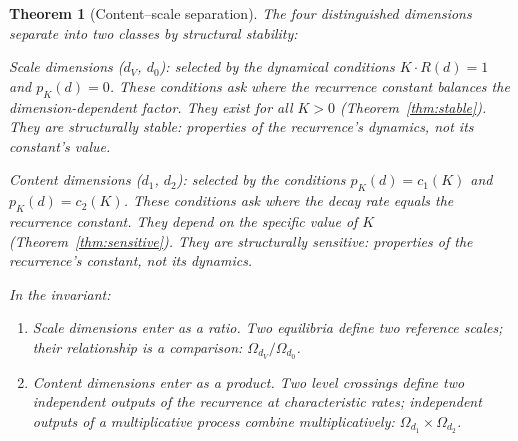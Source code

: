 \documentclass[11pt,a4paper]{article}
\newtheorem{theorem}{Theorem}[section]
\begin{document}
\begin{theorem}[Content--scale separation]\label{thm:cs}
The four distinguished dimensions separate into two classes by structural
stability:

\emph{Scale dimensions} ($d_V$, $d_0$): selected by the dynamical
conditions $K\cdot R(d) = 1$ and $p_K(d) = 0$. These conditions ask where
the recurrence constant \emph{balances} the dimension-dependent factor.
They exist for all $K > 0$ (Theorem~\ref{thm:stable}). They are
structurally stable: properties of the recurrence's dynamics, not its
constant's value.

\emph{Content dimensions} ($d_1$, $d_2$): selected by the conditions
$p_K(d) = c_1(K)$ and $p_K(d) = c_2(K)$. These conditions ask where the
decay rate \emph{equals} the recurrence constant. They depend on the
specific value of $K$ (Theorem~\ref{thm:sensitive}). They are structurally
sensitive: properties of the recurrence's constant, not its dynamics.

In the invariant:
\begin{enumerate}
\item[(i)] Scale dimensions enter as a \emph{ratio}. Two equilibria define
two reference scales; their relationship is a comparison:
$\Omega_{d_V}/\Omega_{d_0}$.

\item[(ii)] Content dimensions enter as a \emph{product}. Two level
crossings define two independent outputs of the recurrence at
characteristic rates; independent outputs of a multiplicative process
combine multiplicatively: $\Omega_{d_1}\times\Omega_{d_2}$.
\end{enumerate}
\end{theorem}
\end{document}
